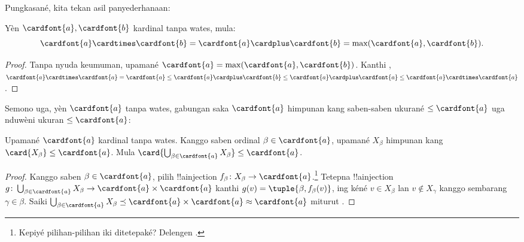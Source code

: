 \documentclass[../../../include/open-logic-section]{subfiles}
\begin{document}
Pungkasané, kita tekan asil panyederhanaan:

\begin{thm}
Yèn $\cardfont{a}, \cardfont{b}$ kardinal tanpa wates, mula:
\[
	\cardfont{a}
\cardtimes \cardfont{b} = \cardfont{a} \cardplus \cardfont{b} =
\text{max}(\cardfont{a}, \cardfont{b}).
\]
\end{thm}

\begin{proof}
Tanpa nyuda keumuman, upamané $\cardfont{a} = \max(\cardfont{a},
\cardfont{b})$. Kanthi ,
$\cardfont{a}\cardtimes\cardfont{a} = \cardfont{a} \leq \cardfont{a}
\cardplus \cardfont{b} \leq \cardfont{a} \cardplus \cardfont{a} \leq
\cardfont{a} \cardtimes \cardfont{a}$. \end{proof}\noindent Semono uga,
yèn $\cardfont{a}$ tanpa wates, gabungan saka
$\cardfont{a}$ himpunan kang saben-saben ukurané
$\leq\cardfont{a}$ uga nduwèni ukuran $\leq\cardfont{a}$:

\begin{prop}
Upamané $\cardfont{a}$ kardinal tanpa wates. Kanggo saben ordinal $\beta
\in \cardfont{a}$, upamané $X_\beta$ himpunan kang $\card{X_\beta} \leq
\cardfont{a}$. Mula $\card{\bigcup_{\beta \in \cardfont{a}} X_\beta}
\leq \cardfont{a}$.
\end{prop}

\begin{proof}
Kanggo saben $\beta \in \cardfont{a}$, pilih !!a{injection} $f_\beta \colon
X_\beta \to \cardfont{a}$.\footnote{Kepiyé pilihan-pilihan iki ditetepaké? Delengen .} Tetepna !!a{injection} $g \colon
\bigcup_{\beta \in \cardfont{a}} X_\beta \to \cardfont{a} \times
\cardfont{a}$ kanthi $g(v) = \tuple{\beta, f_\beta(v)}$, ing kéné $v \in
X_\beta$ lan $v \notin X_\gamma$ kanggo sembarang $\gamma \in \beta$. Saiki
$\bigcup_{\beta \in \cardfont{a}} X_\beta \preceq \cardfont{a} \times
\cardfont{a} \approx \cardfont{a}$ miturut .
\end{proof}
\end{document}
